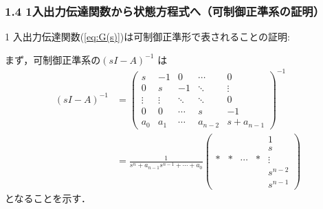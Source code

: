 \begin{frame}[t]
\frametitle{1.4 1入出力伝達関数から状態方程式へ{\small （可制御正準系の証明）}}
1 入出力伝達関数(\ref{eq:G(s)})は可制御正準形で表されることの証明:

まず，可制御正準系の$(sI-A)^{-1}$ は
\begin{align}
 (sI-A)^{-1}
 &=
    \left(\begin{array}{ccccc}
     s      & -1     &  0     & \cdots &  0 \\
	 0      &  s     & -1     & \ddots &  \vdots \\
	 \vdots & \vdots & \ddots & \ddots &  0 \\
	 0      &  0     & \cdots & s      & -1 \\
	 a_0    &  a_1   & \cdots & a_{n-2}  &  s+a_{n-1}
	\end{array}\right)^{-1}
\nonumber\\
 &=
    \frac{1}{s^n + a_{n-1} s^{n-1}  + \cdots + a_0}
    \left(\begin{array}{ccccc}
        &    &        &    &  1 \\
	    &    &        &    &  s \\
	  * &  * & \cdots &  * &  \vdots \\
	    &    &        &    &  s^{n-2} \\
	    &    &        &    &  s^{n-1}
	\end{array}\right) \label{eq:lemma_inverse}
\end{align}
となることを示す．
\end{frame}

